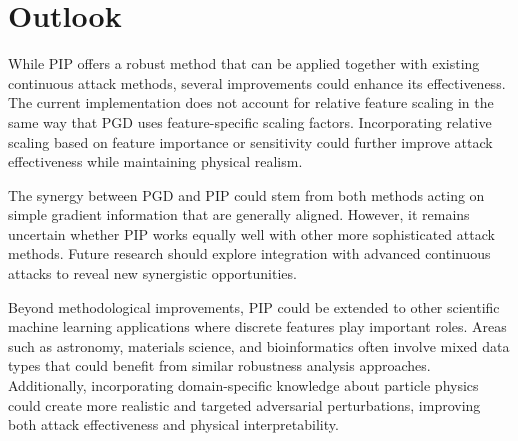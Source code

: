 \newpage

\section*{Outlook}

While PIP offers a robust method that can be applied together with existing continuous attack methods, several improvements could enhance its effectiveness. The current implementation does not account for relative feature scaling in the same way that PGD uses feature-specific scaling factors. Incorporating relative scaling based on feature importance or sensitivity could further improve attack effectiveness while maintaining physical realism.

The synergy between PGD and PIP could stem from both methods acting on simple gradient information that are generally aligned. However, it remains uncertain whether PIP works equally well with other more sophisticated attack methods. Future research should explore integration with advanced continuous attacks to reveal new synergistic opportunities.

Beyond methodological improvements, PIP could be extended to other scientific machine learning applications where discrete features play important roles. Areas such as astronomy, materials science, and bioinformatics often involve mixed data types that could benefit from similar robustness analysis approaches. Additionally, incorporating domain-specific knowledge about particle physics could create more realistic and targeted adversarial perturbations, improving both attack effectiveness and physical interpretability.